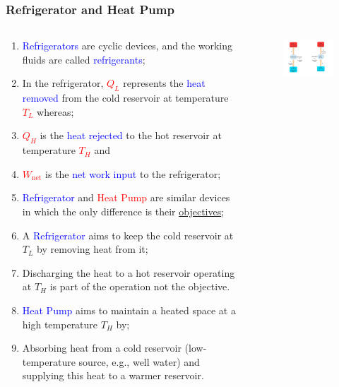 \documentclass[10pt,compress]{beamer}
\begin{document}
\begin{frame}
 \frametitle{Refrigerator and Heat Pump}
  \begin{columns}
   \begin{column}[c]{0.45\linewidth}
    \begin{enumerate}[(1)]\scriptsize
     \item <1-> \textcolor{blue}{Refrigerators} are cyclic devices, and the working fluids are called \textcolor{blue}{refrigerants};
     \item <1-> In the refrigerator, \textcolor{red}{$Q_{L}$} represents the \textcolor{blue}{heat removed} from the cold reservoir at temperature \textcolor{red}{$T_{L}$} whereas;
     \item <1-> \textcolor{red}{$Q_{H}$} is the \textcolor{blue}{heat rejected} to the hot reservoir at temperature \textcolor{red}{$T_{H}$} and 
     \item <1-> \textcolor{red}{$W_{\text{net}}$} is the \textcolor{blue}{net work input} to the refrigerator;
     \item <1-> \textcolor{blue}{Refrigerator} and \textcolor{red}{Heat Pump} are similar devices in which the only difference is their \underline{objectives};
     \item <2-> A \textcolor{blue}{Refrigerator} aims to keep the cold reservoir at $T_{L}$ by removing heat from it;
     \item <2-> Discharging the heat to a hot reservoir operating at $T_{H}$ is part of the operation not the objective.
     \item <3-> \textcolor{blue}{Heat Pump} aims to maintain a heated space at a high temperature $T_{H}$ by;
     \item <3-> Absorbing heat from a cold reservoir (low-temperature source, e.g., well water) and supplying this heat to a warmer reservoir.
    \end{enumerate}
   \end{column}
   \begin{column}[c]{0.55\linewidth}
    \begin{figure}%
     \begin{center}
      \includegraphics[width=7.5cm,clip]{./Pics/Overview_Refrig2}
     \end{center}
    \end{figure}
   \end{column}  
  \end{columns}
\end{frame}
\end{document}
